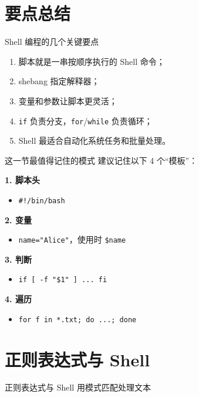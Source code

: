 \documentclass[aspectratio=169]{beamer}
\begin{document}
\section{要点总结}

\begin{frame}{Shell 编程的几个关键要点}
\begin{enumerate}
  \item 脚本就是一串按顺序执行的 Shell 命令；
  \item shebang 指定解释器；
  \item 变量和参数让脚本更灵活；
  \item \texttt{if} 负责分支，\texttt{for}/\texttt{while} 负责循环；
  \item Shell 最适合自动化系统任务和批量处理。
\end{enumerate}
\end{frame}

\begin{frame}{这一节最值得记住的模式}
建议记住以下 4 个“模板”：

\vspace{0.5em}
\textbf{1. 脚本头}
\begin{itemize}
  \item \texttt{\#!/bin/bash}
\end{itemize}

\textbf{2. 变量}
\begin{itemize}
  \item \texttt{name="Alice"}，使用时 \texttt{\$name}
\end{itemize}

\textbf{3. 判断}
\begin{itemize}
  \item \texttt{if [ -f "\$1" ] ... fi}
\end{itemize}

\textbf{4. 遍历}
\begin{itemize}
  \item \texttt{for f in *.txt; do ...; done}
\end{itemize}
\end{frame}

\section{正则表达式与 Shell}

\begin{frame}{正则表达式与 Shell}
\centering
\Large
用模式匹配处理文本
\end{frame}
\end{document}
